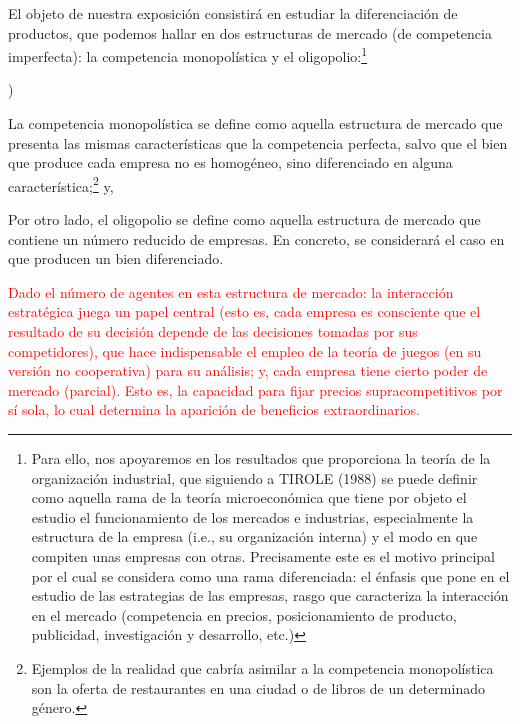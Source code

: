 \documentclass[10pt,a4paper]{article}
\newcounter{alphaitem}
\newenvironment{la}
      {\begin{list}{\alph{alphaitem})}{%
          \usecounter{alphaitem}%
          \setlength{\leftmargin}{1cm}%
          \setlength{\parskip}{3pt}%
          \setlength{\itemsep}{0pt}%
          \setlength{\parsep}{0pt}%
      }}
      {\end{list}}
\begin{document}
El objeto de nuestra exposición consistirá en estudiar la diferenciación de productos, que podemos hallar en dos estructuras de mercado (de competencia imperfecta): la competencia monopolística y el oligopolio:\footnote{%
    Para ello, nos apoyaremos en los resultados que proporciona la teoría de la organización industrial, que siguiendo a TIROLE (1988) se puede definir como aquella rama de la teoría microeconómica que tiene por objeto el estudio el funcionamiento de los mercados e industrias, especialmente la estructura de la empresa (i.e., su organización interna) y el modo en que compiten unas empresas con otras. Precisamente este es el motivo principal por el cual se considera como una rama diferenciada: el énfasis que pone en el estudio de las estrategias de las empresas, rasgo que caracteriza la interacción en el mercado (competencia en precios, posicionamiento de producto, publicidad, investigación y desarrollo, etc.)
}
\begin{la}
    \item La competencia monopolística se define como aquella estructura de mercado que presenta las mismas características que la competencia perfecta, salvo que el bien que produce cada empresa no es homogéneo, sino diferenciado en alguna característica;\footnote{%
        Ejemplos de la realidad que cabría asimilar a la competencia monopolística son la oferta de restaurantes en una ciudad o de libros de un determinado género.
    } y,
    \item Por otro lado, el oligopolio se define como aquella estructura de mercado que contiene un número reducido de empresas. En concreto, se considerará el caso en que producen un bien diferenciado. 
\end{la}

\textcolor{red}{Dado el número de agentes en esta estructura de mercado: la interacción estratégica juega un papel central (esto es, cada empresa es consciente que el resultado de su decisión depende de las decisiones tomadas por sus competidores), que hace indispensable el empleo de la teoría de juegos (en su versión no cooperativa) para su análisis; y, cada empresa tiene cierto poder de mercado (parcial). Esto es, la capacidad para fijar precios supracompetitivos por sí sola, lo cual determina la aparición de beneficios extraordinarios.}
\end{document}

